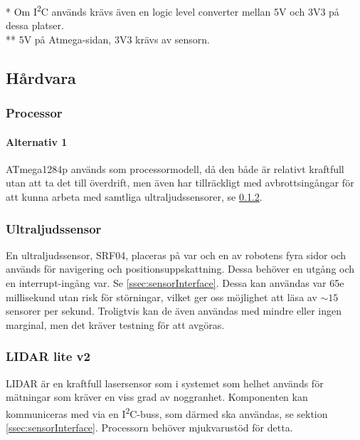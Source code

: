 \documentclass[a4paper,11pt]{article}
\begin{document}
\noindent \begin{small}
    * Om I\textsuperscript{2}C används krävs även en logic level converter mellan 5V och 3V3 på dessa platser.\\
    ** 5V på Atmega-sidan, 3V3 krävs av sensorn.
\end{small}
\subsection{Hårdvara}

\subsubsection{Processor} %

\paragraph{Alternativ 1} %
ATmega1284p används som processormodell, då den både är relativt kraftfull utan att ta det till överdrift, men även har tillräckligt med avbrottsingångar för att kunna arbeta med samtliga ultraljudssensorer, se \ref{sssec:sonicsensors}.

\subsubsection{Ultraljudssensor} \label{sssec:sonicsensors}
En ultraljudssensor, SRF04, placeras på var och en av robotens fyra sidor och används för navigering och positionsuppskattning. Dessa behöver en utgång och en interrupt-ingång var. Se \ref{ssec:sensorInterface}. Dessa kan användas var 65e millisekund utan risk för störningar, vilket ger oss möjlighet att läsa av $\sim15$ sensorer per sekund. Troligtvis kan de även användas med mindre eller ingen marginal, men det kräver testning för att avgöras. %

\subsubsection{LIDAR lite v2} \label{sssec:lidar}
LIDAR är en kraftfull lasersensor som i systemet som helhet används för mätningar som kräver en viss grad av noggranhet. Komponenten kan kommuniceras med via en I\textsuperscript{2}C-buss, som därmed ska användas, se sektion \ref{ssec:sensorInterface}. Processorn behöver mjukvarustöd för detta.
\end{document}
